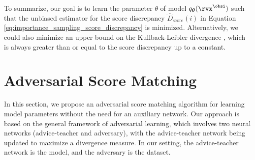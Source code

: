 \documentclass{article} %
\begin{document}
To summarize, our goal is to learn the parameter $\theta$ of model $q_{\bm{\theta}}(\rvx^{\obsi})$ such that the unbiased estimator for the score discrepancy $\widehat{D}_{\text{score}}(i)$ in Equation \eqref{eq:importance_sampling_score_discrepancy} is minimized. Alternatively, we could also minimize an upper bound on the Kullback-Leibler divergence \citep{Song2019}, which is always greater than or equal to the score discrepancy up to a constant.


\section{Adversarial Score Matching}

\label{sec:asm}
In this section, we propose an adversarial score matching algorithm for learning model parameters without the need for an auxiliary network. Our approach is based on the general framework of adversarial learning, which involves two neural networks (advice-teacher and adversary), with the advice-teacher network being updated to maximize a divergence measure. In our setting, the advice-teacher network is the model, and the adversary is the dataset.
\end{document}
